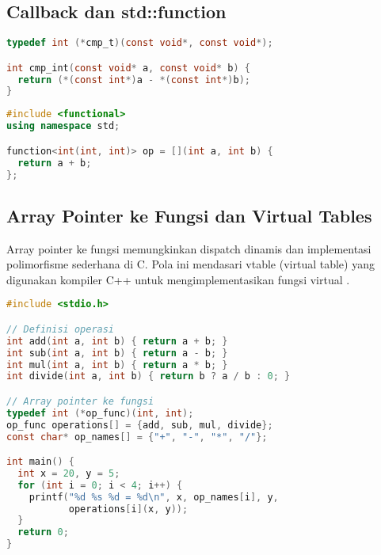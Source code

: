 \documentclass[../main.tex]{subfiles}
\begin{document}
\subsection{Callback dan std::function}
\begin{lstlisting}[language=C, caption={Pointer ke fungsi di C}]
typedef int (*cmp_t)(const void*, const void*);

int cmp_int(const void* a, const void* b) {
  return (*(const int*)a - *(const int*)b);
}
\end{lstlisting}

\begin{lstlisting}[language=C++, caption={std::function dan lambda di C++}]
#include <functional>
using namespace std;

function<int(int, int)> op = [](int a, int b) {
  return a + b;
};
\end{lstlisting}

\subsection{Array Pointer ke Fungsi dan Virtual Tables}
Array pointer ke fungsi memungkinkan dispatch dinamis dan implementasi polimorfisme sederhana di C. Pola ini mendasari vtable (virtual table) yang digunakan kompiler C++ untuk mengimplementasikan fungsi virtual \parencite{gnu-c-manual,cpp-reference}.

\begin{lstlisting}[language=C, caption={Array pointer fungsi untuk dispatch}]
#include <stdio.h>

// Definisi operasi
int add(int a, int b) { return a + b; }
int sub(int a, int b) { return a - b; }
int mul(int a, int b) { return a * b; }
int divide(int a, int b) { return b ? a / b : 0; }

// Array pointer ke fungsi
typedef int (*op_func)(int, int);
op_func operations[] = {add, sub, mul, divide};
const char* op_names[] = {"+", "-", "*", "/"};

int main() {
  int x = 20, y = 5;
  for (int i = 0; i < 4; i++) {
    printf("%d %s %d = %d\n", x, op_names[i], y, 
           operations[i](x, y));
  }
  return 0;
}
\end{lstlisting}
\end{document}
